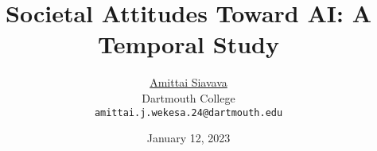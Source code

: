 
\usepackage{arxiv}
\usepackage[utf8]{inputenc} %
\usepackage[T1]{fontenc}    %
\usepackage{hyperref}       %
\usepackage{url}            %
\usepackage{booktabs}       %
\usepackage{amsfonts}       %
\usepackage{nicefrac}       %
\usepackage{microtype}      %
\usepackage{cleveref}       %
\usepackage{lipsum}         %
\usepackage{graphicx}
\usepackage{doi}
\usepackage[backend=bibtex,style=numeric]{biblatex}
\usepackage{pgfplots}
\pgfplotsset{compat=1.18}

\usepackage{subcaption}
\usepackage{array, multirow}

\usepackage{float}

\usepackage{enumitem}

\newenvironment{enumalph}{
  \begin{enumerate}[label=(\alph*)]
}{\end{enumerate}}

\newenvironment{enumroman}{
  \begin{enumerate}[label=(\roman*)]
}{\end{enumerate}}

\newenvironment{enumarabic}{
  \begin{enumerate}[label=\textbf{\arabic*.}]
}{\end{enumerate}}

\newenvironment{enumarabic*}{
  \begin{enumerate}[label*=\textbf{\arabic*.}]
}{\end{enumerate}}


\title{Societal Attitudes Toward AI: A Temporal Study}
\author{
	\href{https://amittai.studio}{Amittai Siavava} \\
		Dartmouth College \\
		\texttt{amittai.j.wekesa.24@dartmouth.edu}
}

\renewcommand{\headeright}{Project Report}
\renewcommand{\undertitle}{Project Report}
\renewcommand{\shorttitle}{}






\date{January 12, 2023}


